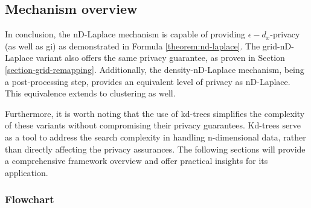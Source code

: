 \subsection{Mechanism overview}
In conclusion, the nD-Laplace mechanism is capable of providing $\epsilon-d_x$-privacy (as well as \gls{gi}) as demonstrated in Formula \ref{theorem:nd-laplace}. The grid-nD-Laplace variant also offers the same privacy guarantee, as proven in Section \ref{section-grid-remapping}. Additionally, the density-nD-Laplace mechanism, being a post-processing step, provides an equivalent level of privacy as nD-Laplace. This equivalence extends to clustering as well.

Furthermore, it is worth noting that the use of kd-trees simplifies the complexity of these variants without compromising their privacy guarantees. Kd-trees serve as a tool to address the search complexity in handling n-dimensional data, rather than directly affecting the privacy assurances.
The following sections will provide a comprehensive framework overview and offer practical insights for its application.

\subsubsection{Flowchart}

